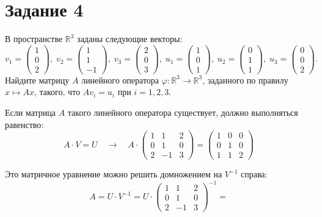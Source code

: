 \documentclass[a4paper,12pt]{article}
\newcommand{\ssolve}{\par\vspace{5pt}\noindent{\bf Решение. }\par}
\begin{document}
\section*{Задание 4}
В пространстве $\mathbb R^3$ заданы следующие векторы:
\[
v_1 =
\begin{pmatrix}
{1}\\{0}\\{2}
\end{pmatrix}
,\;
v_2 =
\begin{pmatrix}
{1}\\{1}\\{-1}
\end{pmatrix}
,\;
v_3 =
\begin{pmatrix}
{2}\\{0}\\{3}
\end{pmatrix}
,\;
u_1 =
\begin{pmatrix}
{1}\\{0}\\{1}
\end{pmatrix}
,\;
u_2 =
\begin{pmatrix}
{0}\\{1}\\{1}
\end{pmatrix}
,\;
u_3 =
\begin{pmatrix}
{0}\\{0}\\{2}
\end{pmatrix}.
\]
Найдите матрицу $A$ линейного оператора $\varphi\colon \mathbb R^3\to \mathbb R^3$, заданного по правилу $x\mapsto Ax$, такого, что $A v_i = u_i$ при $i = 1, 2, 3$. 
\vspace{8pt}

\ssolve
Если матрица $A$ такого линейного оператора существует, должно выполняться равенство:
$$A \cdot V = U 
\quad \longrightarrow \quad
A \cdot 
\begin{pmatrix}
1&1&2\\
0&1&0\\
2&-1&3
\end{pmatrix}
=
\begin{pmatrix}
1&0&0\\
0&1&0\\
1&1&2
\end{pmatrix}
$$ \par
Это матричное уравнение можно решить домножением на $V^{-1}$ справа:
$$A  = U \cdot V^{-1} = 
U \cdot
\begin{pmatrix}
1&1&2\\
0&1&0\\
2&-1&3
\end{pmatrix}^{-1}
=$$
\end{document}
